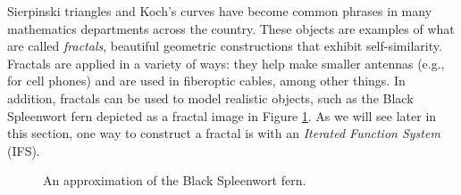  \label{sec:linear_transformation}

\vspace*{-17 pt}

\vspace*{13 pt}


Sierpinski triangles and Koch's curves have become common phrases in many mathematics departments across the country. These objects are examples of what are called \emph{fractals}, beautiful geometric constructions that exhibit self-similarity.  Fractals are applied in a variety of ways: they help make smaller antennas (e.g., for cell phones) and are used in fiberoptic cables, among other things. In addition, fractals can be used to model realistic objects, such as the Black Spleenwort fern depicted as a fractal image in Figure \ref{F:Fern}. As we will see later in this section, one way to construct a fractal is with an \emph{Iterated Function System} (IFS). 
\begin{figure}[h]
\begin{center}
\caption{An approximation of the Black Spleenwort fern.}
\label{F:Fern}
\end{center}
\end{figure}


